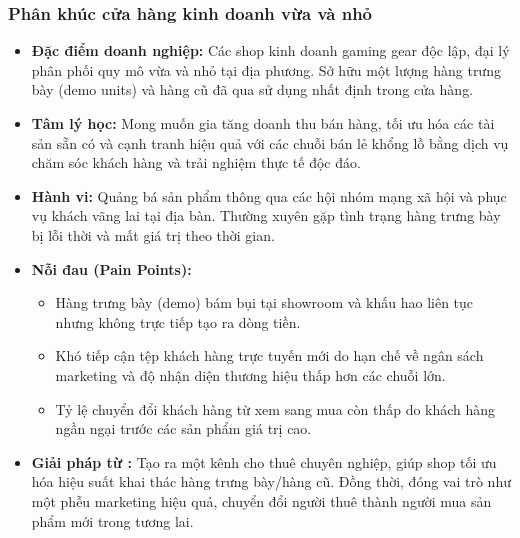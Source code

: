 \subsubsection{Phân khúc cửa hàng kinh doanh vừa và nhỏ}
\begin{itemize}
    \item \textbf{Đặc điểm doanh nghiệp:} Các shop kinh doanh gaming gear độc lập, đại lý phân phối quy mô vừa và nhỏ tại địa phương. Sở hữu một lượng hàng trưng bày (demo units) và hàng cũ đã qua sử dụng nhất định trong cửa hàng.
    \item \textbf{Tâm lý học:} Mong muốn gia tăng doanh thu bán hàng, tối ưu hóa các tài sản sẵn có và cạnh tranh hiệu quả với các chuỗi bán lẻ khổng lồ bằng dịch vụ chăm sóc khách hàng và trải nghiệm thực tế độc đáo.
    \item \textbf{Hành vi:} Quảng bá sản phẩm thông qua các hội nhóm mạng xã hội và phục vụ khách vãng lai tại địa bàn. Thường xuyên gặp tình trạng hàng trưng bày bị lỗi thời và mất giá trị theo thời gian.
    \item \textbf{Nỗi đau (Pain Points):}
    \begin{itemize}
        \item Hàng trưng bày (demo) bám bụi tại showroom và khấu hao liên tục nhưng không trực tiếp tạo ra dòng tiền.
        \item Khó tiếp cận tệp khách hàng trực tuyến mới do hạn chế về ngân sách marketing và độ nhận diện thương hiệu thấp hơn các chuỗi lớn.
        \item Tỷ lệ chuyển đổi khách hàng từ xem sang mua còn thấp do khách hàng ngần ngại trước các sản phẩm giá trị cao.
    \end{itemize}
    \item \textbf{Giải pháp từ \projectname{}:} Tạo ra một kênh cho thuê chuyên nghiệp, giúp shop tối ưu hóa hiệu suất khai thác hàng trưng bày/hàng cũ. Đồng thời, đóng vai trò như một phễu marketing hiệu quả, chuyển đổi người thuê thành người mua sản phẩm mới trong tương lai.
\end{itemize}

